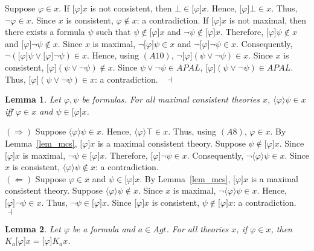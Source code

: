 \documentclass{article}[12pt]
\newtheorem{lemma}{Lemma}
\newenvironment{proof}{\noindent {\bf Proof \ }}{\hfill ~$\dashv$}
\renewcommand{\phi}{\varphi}
\begin{document}
\begin{proof}
Suppose $\phi\in x$.
If $\lbrack\phi\rbrack x$ is not consistent, then $\bot\in\lbrack\phi\rbrack x$.
Hence, $\lbrack\phi\rbrack\bot\in x$.
Thus, $\neg\phi\in x$.
Since $x$ is consistent, $\phi\not\in x$: a contradiction.
If $\lbrack\phi\rbrack x$ is not maximal, then there exists a formula $\psi$ such that $\psi\not\in\lbrack\phi\rbrack x$ and $\neg\psi\not\in\lbrack\phi\rbrack x$.
Therefore, $\lbrack\phi\rbrack\psi\not\in x$ and $\lbrack\phi\rbrack\neg\psi\not\in x$.
Since $x$ is maximal, $\neg\lbrack\phi\rbrack\psi\in x$ and $\neg\lbrack\phi\rbrack\neg\psi\in x$.
Consequently, $\neg(\lbrack\phi\rbrack\psi\vee\lbrack\phi\rbrack\neg\psi)\in x$.
Hence, using $(A10)$, $\neg\lbrack\phi\rbrack(\psi\vee\neg\psi)\in x$.
Since $x$ is consistent, $\lbrack\phi\rbrack(\psi\vee\neg\psi)\not\in x$.
Since $\psi\vee\neg\psi\in APAL$, $\lbrack\phi\rbrack(\psi\vee\neg\psi)\in APAL$.
Thus, $\lbrack\phi\rbrack(\psi\vee\neg\psi)\in x$: a contradiction.
\end{proof}
\begin{lemma}\label{lem_in_diamond}
Let $\phi,\psi$ be formulas.
For all maximal consistent theories $x$, $\langle\phi\rangle\psi\in x$ iff $\phi\in x$ and $\psi\in\lbrack\phi\rbrack x$.
\end{lemma}
\begin{proof}
$(\Rightarrow)$ Suppose $\langle\phi\rangle\psi\in x$.
Hence, $\langle\phi\rangle\top\in x$.
Thus, using $(A8)$, $\phi\in x$.
By Lemma~\ref{lem_mcs}, $\lbrack\phi\rbrack x$ is a maximal consistent theory.
Suppose $\psi\not\in\lbrack\phi\rbrack x$.
Since $\lbrack\phi\rbrack x$ is maximal, $\neg\psi\in\lbrack\phi\rbrack x$.
Therefore, $\lbrack\phi\rbrack\neg\psi\in x$.
Consequently, $\neg\langle\phi\rangle\psi\in x$.
Since $x$ is consistent, $\langle\phi\rangle\psi\not\in x$: a contradiction.
\\
$(\Leftarrow)$ Suppose $\phi\in x$ and $\psi\in\lbrack\phi\rbrack x$.
By Lemma~\ref{lem_mcs}, $\lbrack\phi\rbrack x$ is a maximal consistent theory.
Suppose $\langle\phi\rangle\psi\not\in x$.
Since $x$ is maximal, $\neg\langle\phi\rangle\psi\in x$.
Hence, $\lbrack\phi\rbrack\neg\psi\in x$.
Thus, $\neg\psi\in\lbrack\phi\rbrack x$.
Since $\lbrack\phi\rbrack x$ is consistent, $\psi\not\in\lbrack\phi\rbrack x$: a contradiction.
\end{proof}
\begin{lemma}\label{commutatif}
Let $\phi$ be a formula and $a\in Agt$.
For all theories $x$, if $\phi\in x$, then $K_{a}\lbrack\phi\rbrack x=\lbrack\phi\rbrack K_{a}x$.
\end{lemma}
\end{document}

